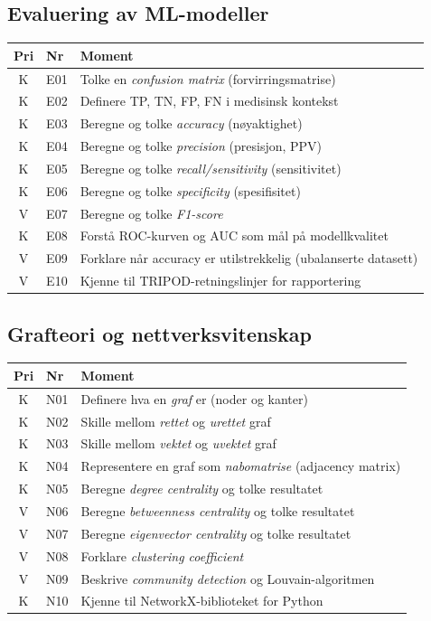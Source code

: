 \documentclass[11pt,a4paper]{article}
\begin{document}
\subsection{Evaluering av ML-modeller}

\begin{longtable}{@{}clp{9cm}@{}}
\toprule
\textbf{Pri} & \textbf{Nr} & \textbf{Moment} \\
\midrule
\endfirsthead
\midrule
\endhead
\midrule
\endfoot
\bottomrule
\endlastfoot
K & E01 & Tolke en \emph{confusion matrix} (forvirringsmatrise) \\
K & E02 & Definere TP, TN, FP, FN i medisinsk kontekst \\
K & E03 & Beregne og tolke \emph{accuracy} (nøyaktighet) \\
K & E04 & Beregne og tolke \emph{precision} (presisjon, PPV) \\
K & E05 & Beregne og tolke \emph{recall/sensitivity} (sensitivitet) \\
K & E06 & Beregne og tolke \emph{specificity} (spesifisitet) \\
V & E07 & Beregne og tolke \emph{F1-score} \\
K & E08 & Forstå ROC-kurven og AUC som mål på modellkvalitet \\
V & E09 & Forklare når accuracy er utilstrekkelig (ubalanserte datasett) \\
V & E10 & Kjenne til TRIPOD-retningslinjer for rapportering \\
\end{longtable}

\subsection{Grafteori og nettverksvitenskap}

\begin{longtable}{@{}clp{9cm}@{}}
\toprule
\textbf{Pri} & \textbf{Nr} & \textbf{Moment} \\
\midrule
\endfirsthead
\midrule
\endhead
\midrule
\endfoot
\bottomrule
\endlastfoot
K & N01 & Definere hva en \emph{graf} er (noder og kanter) \\
K & N02 & Skille mellom \emph{rettet} og \emph{urettet} graf \\
K & N03 & Skille mellom \emph{vektet} og \emph{uvektet} graf \\
K & N04 & Representere en graf som \emph{nabomatrise} (adjacency matrix) \\
K & N05 & Beregne \emph{degree centrality} og tolke resultatet \\
V & N06 & Beregne \emph{betweenness centrality} og tolke resultatet \\
V & N07 & Beregne \emph{eigenvector centrality} og tolke resultatet \\
V & N08 & Forklare \emph{clustering coefficient} \\
V & N09 & Beskrive \emph{community detection} og Louvain-algoritmen \\
K & N10 & Kjenne til NetworkX-biblioteket for Python \\
\end{longtable}
\end{document}
